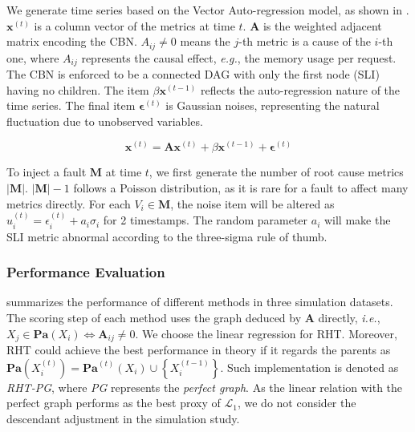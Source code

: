 We generate time series based on the Vector Auto-regression model, as shown in .
$\mathbf{x}^{(t)}$ is a column vector of the metrics at time $t$.
$\mathbf{A}$ is the weighted adjacent matrix encoding the CBN.
$A_{ij} \neq 0$ means the $j$-th metric is a cause of the $i$-th one, where $A_{ij}$ represents the causal effect, \textit{e.g.}, the memory usage per request.
The CBN is enforced to be a connected DAG with only the first node (SLI) having no children.
The item $\beta \mathbf{x}^{(t-1)}$ reflects the auto-regression nature of the time series.
The final item $\mathbf{\epsilon}^{(t)}$ is Gaussian noises, representing the natural fluctuation due to unobserved variables.

\begin{equation}\label{eqn:var}
	\mathbf{x}^{(t)} = \mathbf{A} \mathbf{x}^{(t)} + \beta \mathbf{x}^{(t-1)} + \mathbf{\epsilon}^{(t)}
\end{equation}

To inject a fault $\mathbf{M}$ at time $t$, we first generate the number of root cause metrics $|\mathbf{M}|$.
$|\mathbf{M}| - 1$ follows a Poisson distribution, as it is rare for a fault to affect many metrics directly.
For each $V_{i} \in \mathbf{M}$, the noise item will be altered as $u_{i}^{(t)} = \epsilon_{i}^{(t)} + a_{i} \sigma_{i}$ for 2 timestamps.
The random parameter $a_{i}$ will make the SLI metric abnormal according to the three-sigma rule of thumb.

\subsubsection{Performance Evaluation}

 summarizes the performance of different methods in three simulation datasets.
The scoring step of each method uses the graph deduced by $\mathbf{A}$ directly, \textit{i.e.}, $X_{j} \in \mathbf{Pa}(X_{i}) \Leftrightarrow \mathbf{A}_{ij} \neq 0$.
We choose the linear regression for RHT.
Moreover, RHT could achieve the best performance in theory if it regards the parents as $\mathbf{Pa}(X_{i}^{(t)}) = \mathbf{Pa}^{(t)}(X_{i}) \cup \left\{X_{i}^{(t-1)}\right\}$.
Such implementation is denoted as \textit{RHT-PG}, where \textit{PG} represents the \textit{perfect graph}.
As the linear relation with the perfect graph performs as the best proxy of $\mathcal{L}_{1}$, we do not consider the descendant adjustment in the simulation study.

